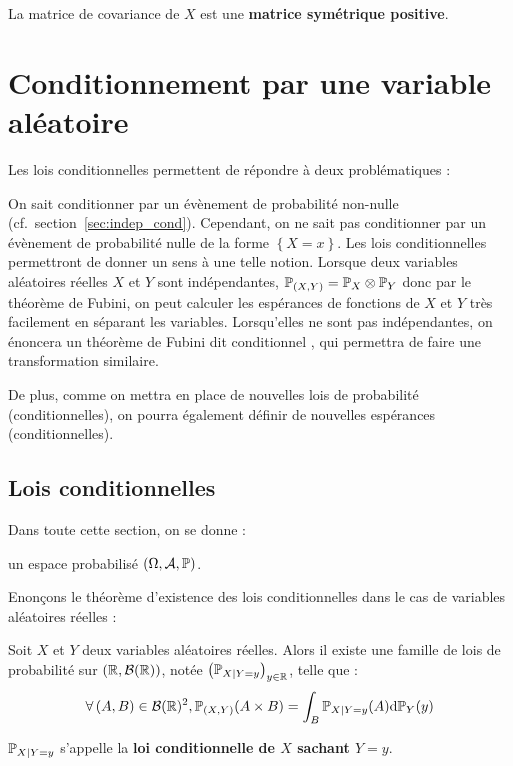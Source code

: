 \documentclass[../integ-proba.tex]{subfiles}
\begin{document}
    \begin{prop}
        La matrice de covariance de $X$ est une \textbf{matrice symétrique positive}.
    \end{prop}

    \section{Conditionnement par une variable aléatoire}

    Les lois conditionnelles permettent de répondre à deux problématiques :
    \begin{itemize}
        \itemb On sait conditionner par un évènement de probabilité non-nulle (cf.\ section~\ref{sec:indep_cond}).
        Cependant, on ne sait pas conditionner par un évènement de probabilité nulle de la forme $\left\{ X = x \right\}$.
        Les lois conditionnelles permettront de donner un sens à une telle notion.
        \itemb Lorsque deux variables aléatoires réelles $X$ et $Y$ sont indépendantes, $\mathbb{P}_{(X,Y)} = \mathbb{P}_X \otimes \mathbb{P}_Y$ donc par le théorème de Fubini, on peut calculer les espérances de fonctions de $X$ et $Y$ très facilement en séparant les variables.
        Lorsqu'elles ne sont pas indépendantes, on énoncera un théorème de Fubini dit \og conditionnel \fg, qui permettra de faire une transformation similaire.
    \end{itemize}

    De plus, comme on mettra en place de nouvelles lois de probabilité (conditionnelles), on pourra également définir de nouvelles espérances (conditionnelles).

    \subsection{Lois conditionnelles}

    Dans toute cette section, on se donne :
    \begin{itemize}
        \itemb un espace probabilisé $\left( \Omega, \mathcal{A}, \mathbb{P} \right)$.
    \end{itemize}

    Enonçons le théorème d'existence des lois conditionnelles dans le cas de variables aléatoires réelles :

    \begin{thm}
        Soit $X$ et $Y$ deux variables aléatoires réelles.
        Alors il existe une famille de lois de probabilité sur $\left( \mathbb{R}, \mathcal{B}(\mathbb{R}) \right)$, notée $\left( \mathbb{P}_{X | Y = y} \right)_{y \in \mathbb{R}}$, telle que :
        \begin{displaymath}
            \forall \left( A, B \right) \in \mathcal{B}(\mathbb{R})^2, \mathbb{P}_{\left( X,Y \right)}(A \times B) = \int_B \mathbb{P}_{X | Y = y}(A) \textnormal{d}\mathbb{P}_Y(y)
        \end{displaymath}

        $\mathbb{P}_{X | Y = y}$ s'appelle la \textbf{loi conditionnelle de $X$ sachant $Y = y$}.
    \end{thm}
\end{document}
